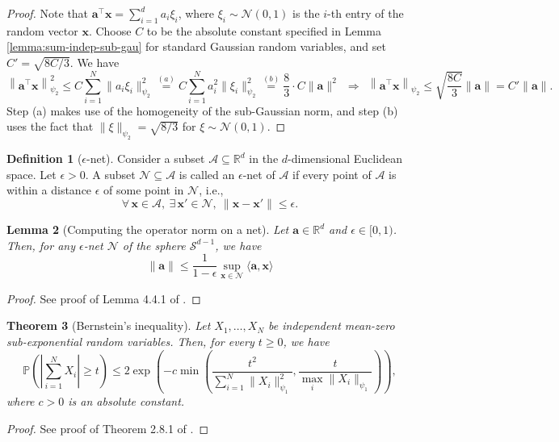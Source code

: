 \documentclass{article}
\theoremstyle{plain}
\newtheorem{theorem}{Theorem}[section]
\newtheorem{lemma}[theorem]{Lemma}
\theoremstyle{definition}
\newtheorem{definition}[theorem]{Definition}
\theoremstyle{remark}
\begin{document}
\begin{proof}
    Note that $\mathbf a^\top \mathbf x = \sum_{i = 1}^d a_i \xi_i$, where $\xi_i \sim \mathcal N(0,1)$ is the $i$-th entry of the random vector $\mathbf x$. Choose $C$ to be the absolute constant specified in Lemma \ref{lemma:sum-indep-sub-gau} for standard Gaussian random variables, and set $C' = \sqrt{8C/3}$. We have
    \[
    \left\| \mathbf a^\top \mathbf x \right\|^2_{\psi_2} \le C \sum_{i=1}^N \|a_i\xi_i\|^2_{\psi_2} \overset{(a)}{=} C \sum_{i=1}^N a_i^2 \|\xi_i\|^2_{\psi_2} \overset{(b)}{=} \frac{8}{3}\cdot C \|\mathbf a\|^2~~\Rightarrow~~ \left\| \mathbf a^\top \mathbf x \right\|_{\psi_2} \le \sqrt{\frac{8C}{3}}\|\mathbf a\| = C'\|\mathbf a\|.
    \]    
    Step (a) makes use of the homogeneity of the sub-Gaussian norm, and step (b) uses the fact that $\|\xi\|_{\psi_2} = \sqrt{8/3}$ for $\xi \sim \mathcal N(0,1)$.
\end{proof}

\begin{definition}[$\epsilon$-net]
Consider a subset $\mathcal A \subseteq \mathbb R^d$ in the $d$-dimensional Euclidean space. Let $\epsilon > 0$. A subset $\mathcal N \subseteq \mathcal A$ is called an $\epsilon$-net of $\mathcal A$ if every point of $\mathcal A$ is within a distance $\epsilon$ of some point in $\mathcal N$, i.e., 
\[
\forall\,\mathbf x \in \mathcal A, ~\exists\, \mathbf x' \in \mathcal N, ~\| \mathbf x-\mathbf x'\| \le \epsilon.
\]
    
\end{definition}

\begin{lemma}[Computing the operator norm on a net] \label{eps-net}
Let $\mathbf{a} \in \mathbb{R}^d$ and $\epsilon \in [0,1)$. Then, for any $\epsilon$-net $\mathcal{N}$ of the sphere  $\mathcal{S}^{d-1}$, we have
\[
    \lVert \mathbf{a} \rVert \leq \frac{1}{1-\epsilon} \sup_{\mathbf{x} \in \mathcal{N}} \langle \mathbf{a}, \mathbf{x}\rangle 
\]
\end{lemma}
\begin{proof}
    See proof of Lemma 4.4.1 of \cite{vershynin2018high}.
\end{proof}

\begin{theorem}[Bernstein's inequality] \label{berstein}
Let $X_1, \dots, X_N$ be independent mean-zero sub-exponential random variables. Then, for every $t \geq 0$, we have
\[
\mathbb{P} \left( \left| \sum_{i=1}^N X_i \right| \geq t \right) \leq 2 \exp \left( -c \min \left( \frac{t^2}{\sum_{i=1}^N \| X_i \|_{\psi_1}^2}, \frac{t}{\max_i \| X_i \|_{\psi_1}} \right) \right),
\]
where $c > 0$ is an absolute constant.
\end{theorem}
\begin{proof}
    See proof of Theorem 2.8.1 of \cite{vershynin2018high}.
\end{proof}
\end{document}
